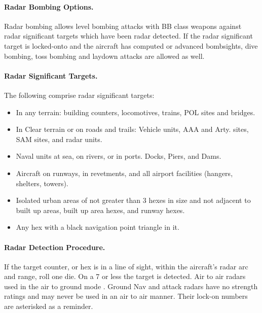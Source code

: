 \begin{advancedrules}
\paragraph{Radar Bombing Options.} Radar bombing allows level bombing attacks with BB class weapons against radar significant targets which have been radar detected. If the radar significant target is locked-onto and the aircraft has computed or advanced bombsights, dive bombing, toss bombing and laydown attacks are allowed as well.

\paragraph{Radar Significant Targets.} The following comprise radar significant targets:

\begin{itemize}

    \item In any terrain: building counters, locomotives, trains, POL sites and bridges.

    \item In Clear terrain or on roads and trails: Vehicle units, AAA and Arty. sites, SAM sites, and radar units.

    \item Naval units at sea, on rivers, or in ports. Docks, Piers, and Dams.

    \item Aircraft on runways, in revetments, and all airport facilities (hangers, shelters, towers).

    \item Isolated urban areas of not greater than 3 hexes in size and not adjacent to built up areas, built up area hexes, and runway hexes.
    
    \item Any hex with a black navigation point triangle in it.

\end{itemize}

\paragraph{Radar Detection Procedure.} If the target counter, or hex is in a line of sight, within the aircraft's radar arc and  range, roll one die. On a 7 or less the target is detected. Air to air radars used in the air to ground mode . Ground Nav and attack radars have no strength ratings and may never be used in an air to air manner. Their lock-on numbers are asterisked as a reminder.


\end{advancedrules}
